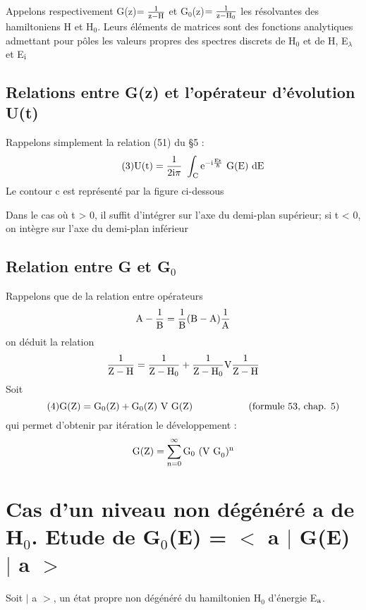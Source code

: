 Appelons respectivement G(z)$=\frac{1}{\text{z}-\text{H}}$ et G$_0$(z)$=\frac{1}{\text{z}-\text{H}_0}$
les résolvantes des hamiltoniens H et H$_0$. Leurs éléments de matrices sont des fonctions
analytiques admettant pour pôles les valeurs propres des spectres discrets de H$_0$ et de
H, E$_\lambda$ et E$_{\text{i}}$

\subsection{Relations entre G(z) et l'opérateur d'évolution U(t)}%
Rappelons simplement la relation (51) du \S 5 :
\[
\tag{3}\mt{U}(\mt{t})=\frac{1}{2\mt{i}\pi}\ \int_\mt{C}\mt{e}^{-\mt{i}\frac{\mt{Et}}{\hbar}}\mt{ G(E) dE}
\]
Le contour c est représenté par la figure ci-dessous\begin{center}
 \end{center}
Dans le cas où t > 0, il suffit d'intégrer sur l'axe du demi-plan supérieur; si
t < 0, on intègre sur l'axe du demi-plan inférieur


\subsection{Relation entre G et G$_0$}%

Rappelons que de la relation entre opérateurs
\[
{\text{A}}-\frac{1}{\text{B}}=\frac{1}{\text{B}}(\text{B}-\text{A})\frac{1}{\text{A}}
\]
on déduit la relation
\[
\frac{1}{\text{Z}-\text{H}}=\frac{1}{\text{Z}-\text{H}_0}+\frac{1}{\text{Z}-\text{H}_0}\text{V}\frac{1}{\text{Z}-\text{H}}
\]
Soit
\[
\tag{4}\text{G(Z)}=\text{G}_0\text{(Z)}+\text{G}_0\text{(Z) V G(Z)} \hspace{2cm} \text{(formule 53, chap. 5)}
\]
qui permet d'obtenir par itération le développement :
\[
\text{G(Z)}=\sum_{\text{n}=0}^\infty\text{G}_0\text{ (V G}_0)^{\text{n}}
\]
\section{Cas d'un niveau non dégénéré a de H$_0$. Etude de G$_0$(E) = $<$ a $|$ G(E) $|$ a $>$}%
Soit $|$ a $>$, un état propre non dégénéré du hamiltonien H$_0$
d'énergie E$_{\text{a}}$.

